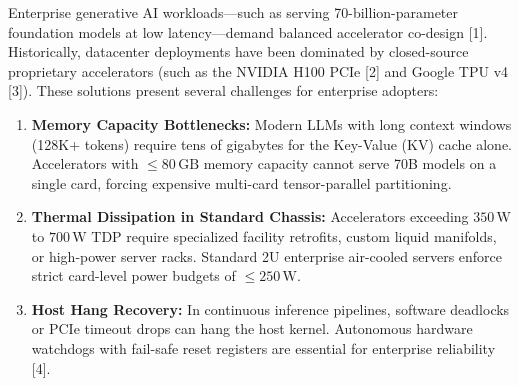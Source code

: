\documentclass[journal,10pt,twocolumn]{IEEEtran}
\begin{document}
Enterprise generative AI workloads—such as serving 70-billion-parameter foundation models at low latency—demand balanced accelerator co-design [1]. Historically, datacenter deployments have been dominated by closed-source proprietary accelerators (such as the NVIDIA H100 PCIe [2] and Google TPU v4 [3]). These solutions present several challenges for enterprise adopters:
\begin{enumerate}
  \item \textbf{Memory Capacity Bottlenecks:} Modern LLMs with long context windows (128K+ tokens) require tens of gigabytes for the Key-Value (KV) cache alone. Accelerators with $\le 80\,\text{GB}$ memory capacity cannot serve 70B models on a single card, forcing expensive multi-card tensor-parallel partitioning.
  \item \textbf{Thermal Dissipation in Standard Chassis:} Accelerators exceeding $350\,\text{W}$ to $700\,\text{W}$ TDP require specialized facility retrofits, custom liquid manifolds, or high-power server racks. Standard 2U enterprise air-cooled servers enforce strict card-level power budgets of $\le 250\,\text{W}$.
  \item \textbf{Host Hang Recovery:} In continuous inference pipelines, software deadlocks or PCIe timeout drops can hang the host kernel. Autonomous hardware watchdogs with fail-safe reset registers are essential for enterprise reliability [4].
\end{enumerate}
\end{document}
